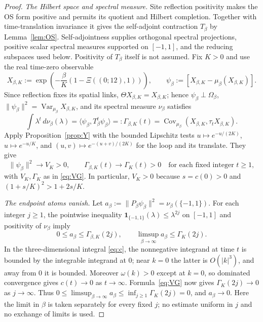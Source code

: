 \documentclass[11pt,a4paper]{article}
\theoremstyle{plain}
\theoremstyle{definition}
\theoremstyle{remark}
\numberwithin{equation}{section}
\newcommand{\Var}{\operatorname{Var}}
\newcommand{\Cov}{\operatorname{Cov}}
\newcommand{\Th}{\Theta}
\begin{document}
\begin{proof}
\emph{The Hilbert space and spectral measure.}
Site reflection positivity makes the OS form positive and permits its quotient and Hilbert completion.
Together with time-translation invariance it gives the self-adjoint contraction $T_\beta$ by Lemma~\ref{lem:OS}.
Self-adjointness supplies orthogonal spectral projections, positive scalar spectral measures supported on $[-1,1]$, and the reducing
subspaces used below. Positivity of $T_\beta$ itself is not assumed.
Fix $K>0$ and use the real time-zero observable
\[
X_{\beta,K}:=\exp\!\left(-\frac\beta K(1-\Xi((0;12),1))\right),\qquad
\psi_\beta:=[X_{\beta,K}-\mu_\beta(X_{\beta,K})].
\]
Since reflection fixes its spatial links, $\Th X_{\beta,K}=X_{\beta,K}$; hence
$\psi_\beta\perp\Omega_\beta$, $\|\psi_\beta\|^2=\Var_{\mu_\beta}X_{\beta,K}$, and its spectral measure $\nu_\beta$ satisfies
\[
\int\lambda^t\,d\nu_\beta(\lambda)
=\langle\psi_\beta,T_\beta^t\psi_\beta\rangle
=:\Gamma_{\beta,K}(t)
=\Cov_{\mu_\beta}(X_{\beta,K},\tau_tX_{\beta,K}).
\]
Apply Proposition~\ref{prop:Y} with the bounded Lipschitz tests $u\mapsto e^{-u/(2K)}$, $u\mapsto e^{-u/K}$, and
$(u,v)\mapsto e^{-(u+v)/(2K)}$ for the loop and its translate. They give
\[
\|\psi_\beta\|^2\longrightarrow V_K>0,\qquad
\Gamma_{\beta,K}(t)\longrightarrow\Gamma_K(t)>0
\quad\text{for each fixed integer }t\ge1,
\]
with $V_K,\Gamma_K$ as in \eqref{eq:VG}. In particular, $V_K>0$ because $s=c(0)>0$ and
$(1+s/K)^2>1+2s/K$.

\emph{The endpoint atoms vanish.}
Let $a_\beta:=\|P_\beta\psi_\beta\|^2=\nu_\beta(\{-1,1\})$.
For each integer $j\ge1$, the pointwise inequality
$\mathbf1_{\{-1,1\}}(\lambda)\le\lambda^{2j}$ on $[-1,1]$ and positivity of $\nu_\beta$ imply
\[
0\le a_\beta\le\Gamma_{\beta,K}(2j),\qquad
\limsup_{\beta\to\infty}a_\beta\le\Gamma_K(2j).
\]
In the three-dimensional integral \eqref{eq:c}, the nonnegative integrand at time $t$ is bounded by the integrable integrand at $0$;
near $k=0$ the latter is $O(|k|^3)$, and away from $0$ it is bounded.
Moreover $\omega(k)>0$ except at $k=0$, so dominated convergence gives $c(t)\to0$ as $t\to\infty$.
Formula~\eqref{eq:VG} now gives $\Gamma_K(2j)\to0$ as $j\to\infty$.
Thus $0\le\limsup_{\beta\to\infty}a_\beta\le\inf_{j\ge1}\Gamma_K(2j)=0$, and $a_\beta\to0$.
Here the limit in $\beta$ is taken separately for every fixed $j$; no estimate uniform in $j$ and no exchange of limits is used.


\end{proof}
\end{document}
